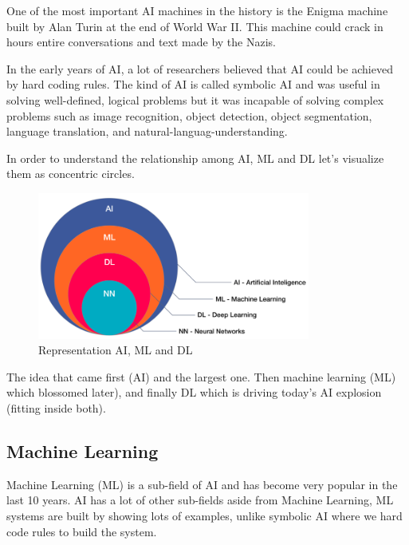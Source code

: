 One of the most important AI machines in the history is the Enigma machine built by Alan Turin at the end of World War II. 
This machine could crack in hours entire conversations and text made by the Nazis.

In the early years of AI, a lot of researchers believed that AI could be achieved by hard coding rules. The kind of AI is called symbolic AI and was useful in solving well-defined, logical problems but it was incapable of solving complex problems such as image recognition, object detection, object segmentation, language translation, and natural-languag-understanding.

In order to understand the relationship among AI, ML and DL let's visualize them as concentric circles.


\begin{figure}[H]
\centering
\includegraphics[width=0.8\textwidth]{./figures/ai-ml-dl}
\caption{Representation AI, ML and DL \cite{ai-ml-dl-image}}
\end{figure}

The idea that came first (AI) and the largest one. Then machine learning (ML) which blossomed later), and finally  DL which is driving today's AI explosion (fitting inside both).

\subsection[Machine Learning]{Machine Learning}
Machine Learning (ML) is a sub-field of AI and has become very popular in the last 10 years. AI has a lot of other sub-fields aside from Machine Learning, ML systems are built by showing lots of examples, unlike symbolic AI where we hard code rules to build the system. 

